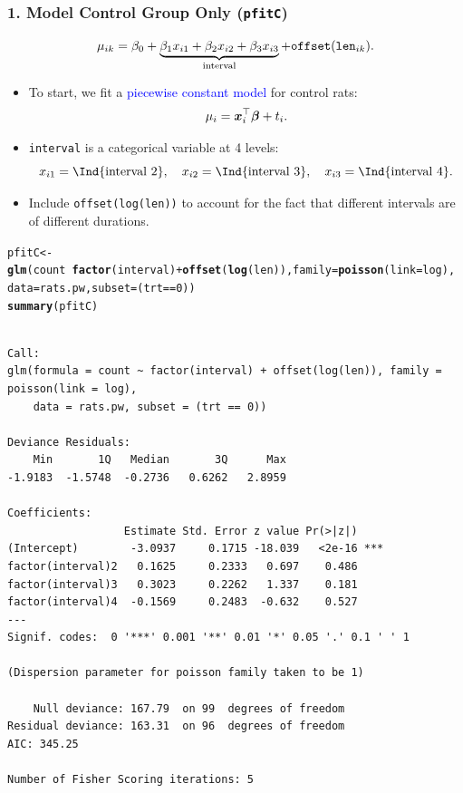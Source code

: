 \documentclass[oneside]{book}\usepackage[]{graphicx}\usepackage[svgnames]{xcolor}
\makeatletter
\newcommand{\hlnum}[1]{\textcolor[rgb]{0.686,0.059,0.569}{#1}}%
\newcommand{\hlopt}[1]{\textcolor[rgb]{0,0,0}{#1}}%
\newcommand{\hlstd}[1]{\textcolor[rgb]{0.345,0.345,0.345}{#1}}%
\newcommand{\hlkwb}[1]{\textcolor[rgb]{0.69,0.353,0.396}{#1}}%
\newcommand{\hlkwc}[1]{\textcolor[rgb]{0.333,0.667,0.333}{#1}}%
\newcommand{\hlkwd}[1]{\textcolor[rgb]{0.737,0.353,0.396}{\textbf{#1}}}%
\newenvironment{kframe}{%
 \def\at@end@of@kframe{}%
 \ifinner\ifhmode%
  \def\at@end@of@kframe{\end{minipage}}%
  \begin{minipage}{\columnwidth}%
 \fi\fi%
 \def\FrameCommand##1{\hskip\@totalleftmargin \hskip-\fboxsep
 \colorbox{shadecolor}{##1}\hskip-\fboxsep
     \hskip-\linewidth \hskip-\@totalleftmargin \hskip\columnwidth}%
 \MakeFramed {\advance\hsize-\width
   \@totalleftmargin\z@ \linewidth\hsize
   \@setminipage}}%
 {\par\unskip\endMakeFramed%
 \at@end@of@kframe}
\newenvironment{knitrout}{}{} %
\let\log\relax%
\providecommand{\Vector}[1]{\bm{#1}}%
\makeatother
\begin{document}
\subsubsection*{1. Model Control Group Only (\texttt{pfitC})}
\[ \log{\mu_{ik}}=\beta_0+\underbrace{\beta_1x_{i1}+\beta_2x_{i2}+\beta_3x_{i3}}_{\text{interval}}+\texttt{offset}(\log{\texttt{len}_{ik}}). \]
\begin{itemize}
      \item To start, we fit a \textcolor{Blue}{piecewise constant model} for control rats:
            \[ \log{\mu_i}=\Vector{x}_i^\top \Vector{\beta}+\log{t_i}. \]
      \item \texttt{interval} is a categorical variable at 4 levels:
            \[ x_{i1}=\Ind{\text{interval 2}},\quad x_{i2}=\Ind{\text{interval 3}},\quad x_{i3}=\Ind{\text{interval 4}}. \]
      \item Include \texttt{offset(log(len))} to account for the fact that different intervals are of
            different durations.
\end{itemize}
\begin{knitrout}
\color{fgcolor}\begin{kframe}
\begin{alltt}
\hlstd{pfitC} \hlkwb{<-} \hlkwd{glm}\hlstd{(count} \hlopt{~} \hlkwd{factor}\hlstd{(interval)} \hlopt{+} \hlkwd{offset}\hlstd{(}\hlkwd{log}\hlstd{(len)),} \hlkwc{family} \hlstd{=} \hlkwd{poisson}\hlstd{(}\hlkwc{link} \hlstd{= log),}
  \hlkwc{data} \hlstd{= rats.pw,} \hlkwc{subset} \hlstd{= (trt} \hlopt{==} \hlnum{0}\hlstd{))}
\hlkwd{summary}\hlstd{(pfitC)}
\end{alltt}
\begin{verbatim}

Call:
glm(formula = count ~ factor(interval) + offset(log(len)), family = poisson(link = log), 
    data = rats.pw, subset = (trt == 0))

Deviance Residuals: 
    Min       1Q   Median       3Q      Max  
-1.9183  -1.5748  -0.2736   0.6262   2.8959  

Coefficients:
                  Estimate Std. Error z value Pr(>|z|)    
(Intercept)        -3.0937     0.1715 -18.039   <2e-16 ***
factor(interval)2   0.1625     0.2333   0.697    0.486    
factor(interval)3   0.3023     0.2262   1.337    0.181    
factor(interval)4  -0.1569     0.2483  -0.632    0.527    
---
Signif. codes:  0 '***' 0.001 '**' 0.01 '*' 0.05 '.' 0.1 ' ' 1

(Dispersion parameter for poisson family taken to be 1)

    Null deviance: 167.79  on 99  degrees of freedom
Residual deviance: 163.31  on 96  degrees of freedom
AIC: 345.25

Number of Fisher Scoring iterations: 5
\end{verbatim}
\end{kframe}
\end{knitrout}
\end{document}
